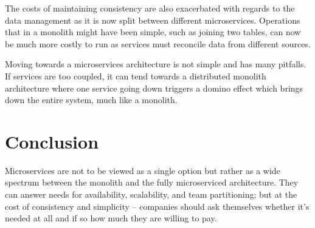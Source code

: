 \documentclass[conference]{IEEEtran}
\begin{document}
    The costs of maintaining consistency are also exacerbated with regards to the data management as it is now split between different microservices.
    Operations that in a monolith might have been simple, such as joining two tables, can now be much more costly to run as services must reconcile data from different sources.

    Moving towards a microservices architecture is not simple and has many pitfalls.
    If services are too coupled, it can tend towards a distributed monolith architecture where one service going down triggers a domino effect which brings down the entire system, much like a monolith.


    \section{Conclusion}

    Microservices are not to be viewed as a single option but rather as a wide spectrum between the monolith and the fully microserviced architecture.
    They can answer needs for availability, scalability, and team partitioning;
    but at the cost of consistency and simplicity -- companies should ask themselves whether it's needed at all and if so how much they are willing to pay.

    \printbibliography
\end{document}
